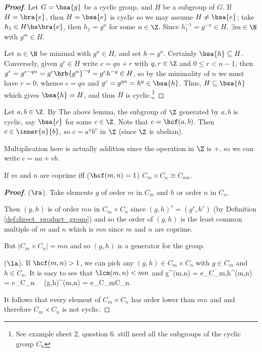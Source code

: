\begin{proof}[\bf Proof]
Let $G = \bsa{g}$ be a cyclic group, and $H$ be a subgroup of $G$. If $H = \bra{e}$, then $H=\bsa{e}$ is cyclic so we may assume $H \neq \bsa{e}$; take $h_1\in H\bs \bra{e}$, then $h_1 = g^n$ for some $n \in \Z$. Since $h_1^{-1} = g^{-n} \in H$, $\exists m\in \N$ with $g^m \in H$.

Let $n\in \N$ be minimal with $g^n \in H$, and set $h = g^n$. Certainly $\bsa{h}\subseteq H$. Conversely, given $g^r\in H$ write $c = qn + r$ with $q,r\in \Z$ and $0\leq r < n-1$, then $g^r = g^{c -qn} = g^c \brb{g^n}^{-q} = g^c h^{-q} \in H$, so by the minimality of $n$ we must have $r=0$, whence $c = qn$ and $g^c = g^{qn} = h^q \in \bsa{h}$. Thus, $H\subseteq \bsa{h}$ which gives $\bsa{h} = H$, and thus $H$ is cyclic.\footnote{See example sheet 2, question 6. still need all the subgroups of the cyclic group $C_n$}
\end{proof}

\begin{remark}
Let $a,b\in \Z$. By The above lemma, the subgroup of $\Z$ generated by $a,b$ is cyclic, say $\bsa{c}$ for some $c\in\Z$. Note that $c= \hcf(a,b)$. Then $c\in \inner{a}{b}$, so $c = a^u b^v$ in $\Z$ (since $\Z$ is abelian).
\end{remark}

\begin{remark}
Multiplication here is actually addition since the operation in $\Z$ is $+$, so we can write $c = ua + vb$.
\end{remark}


\begin{lemma}\label{lem:coprime_cong_cyclic_group}
If $m$ and $n$ are coprime iff ($\hcf(m,n) = 1$) $C_m \times C_n \cong C_{mn}$.
\end{lemma}

\begin{proof}[\bf Proof]
($\ra$). Take elements $g$ of order $m$ in $C_m$ and $h$ or order $n$ in $C_n$.

Then $(g, h)$ is of order $mn$ in $C_m \times C_n$ since $(g, h)^r = (g^r, h^r)$ (by Definition \ref{def:direct_product_group}) and so the order of $(g, h)$ is the least common multiple of $m$ and $n$ which is $mn$ since $m$ and $n$ are coprime.

But $|C_m \times C_n| = mn$ and so $(g, h)$ is a generator for the group.

($\la$). If $\hcf(m,n) >1$, we can pick any $(g,h) \in C_{m}\times C_n$ with $g\in C_m$ and $h\in C_n$. It is easy to see that $\lcm(m,n) < mn$ and
\be
g^{\lcm(m,n)} = e_{C_m},\qquad h^{\lcm(m,n)} = e_{C_n} \ \ra\ (g,h)^{\lcm(m,n)} = e_{C_m\times C_n}.
\ee

It follows that every element of $C_m\times C_n$ has order lower than $mn$ and and therefore $C_m\times C_n$ is not cyclic.
\end{proof}

